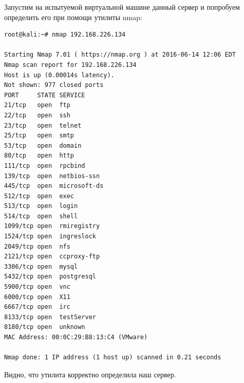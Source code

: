 \documentclass[10pt,a4paper,titlepage]{article}
\begin{document}
Запустим на испытуемой виртуальной машине данный сервер и попробуем определить его при помощи утилиты nmap:
		\begin{verbatim}
root@kali:~# nmap 192.168.226.134

Starting Nmap 7.01 ( https://nmap.org ) at 2016-06-14 12:06 EDT
Nmap scan report for 192.168.226.134
Host is up (0.00014s latency).
Not shown: 977 closed ports
PORT     STATE SERVICE
21/tcp   open  ftp
22/tcp   open  ssh
23/tcp   open  telnet
25/tcp   open  smtp
53/tcp   open  domain
80/tcp   open  http
111/tcp  open  rpcbind
139/tcp  open  netbios-ssn
445/tcp  open  microsoft-ds
512/tcp  open  exec
513/tcp  open  login
514/tcp  open  shell
1099/tcp open  rmiregistry
1524/tcp open  ingreslock
2049/tcp open  nfs
2121/tcp open  ccproxy-ftp
3306/tcp open  mysql
5432/tcp open  postgresql
5900/tcp open  vnc
6000/tcp open  X11
6667/tcp open  irc
8133/tcp open  testServer
8180/tcp open  unknown
MAC Address: 00:0C:29:B8:13:C4 (VMware)

Nmap done: 1 IP address (1 host up) scanned in 0.21 seconds
\end{verbatim}

Видно, что утилита корректно определила наш сервер.
\end{document}
